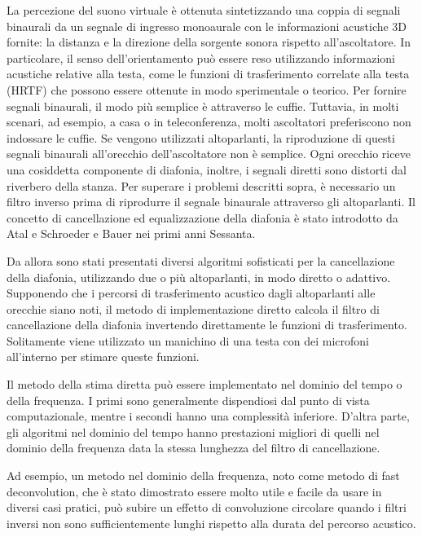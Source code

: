 \documentclass[12pt,a4paper,titlepage]{article}
\begin{document}
La percezione del suono virtuale è ottenuta sintetizzando una coppia di segnali binaurali da un segnale di ingresso monoaurale con le informazioni acustiche 3D fornite: la distanza e la direzione della sorgente sonora rispetto all'ascoltatore. In particolare, il senso dell'orientamento può essere reso utilizzando informazioni acustiche relative alla testa, come le funzioni di trasferimento correlate alla testa (HRTF) che possono essere ottenute in modo sperimentale o teorico. Per fornire segnali binaurali, il modo più semplice è attraverso le cuffie. Tuttavia, in molti scenari, ad esempio, a casa o in teleconferenza, molti ascoltatori preferiscono non indossare le cuffie. Se vengono utilizzati altoparlanti, la riproduzione di questi segnali binaurali all'orecchio dell'ascoltatore non è semplice. Ogni orecchio riceve una cosiddetta componente di diafonia, inoltre, i segnali diretti sono distorti dal riverbero della stanza. Per superare i problemi descritti sopra, è necessario un filtro inverso prima di riprodurre il segnale binaurale attraverso gli altoparlanti. Il concetto di cancellazione ed equalizzazione della diafonia è stato introdotto da Atal e Schroeder e Bauer nei primi anni Sessanta.

Da allora sono stati presentati diversi algoritmi sofisticati per la cancellazione della diafonia, utilizzando due o più altoparlanti, in modo diretto o adattivo. Supponendo che i percorsi di trasferimento acustico dagli altoparlanti alle orecchie siano noti, il metodo di implementazione diretto calcola il filtro di cancellazione della diafonia invertendo direttamente le funzioni di trasferimento. Solitamente viene utilizzato un manichino di una testa con dei microfoni all'interno per stimare queste funzioni.

Il metodo della stima diretta può essere implementato nel dominio del tempo o della frequenza. I primi sono generalmente dispendiosi dal punto di vista computazionale, mentre i secondi hanno una complessità inferiore. D'altra parte, gli algoritmi nel dominio del tempo hanno prestazioni migliori di quelli nel dominio della frequenza data la stessa lunghezza del filtro di cancellazione.

Ad esempio, un metodo nel dominio della frequenza, noto come metodo di fast deconvolution, che è stato dimostrato essere molto utile e facile da usare in diversi casi pratici, può subire un effetto di convoluzione circolare quando
i filtri inversi non sono sufficientemente lunghi rispetto alla durata del percorso acustico.
\end{document}
